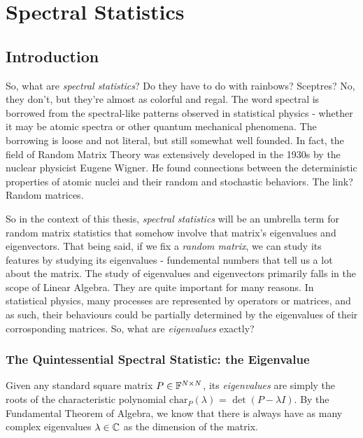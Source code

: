 
\chapter{Spectral Statistics}

\section{Introduction}
So, what are \textit{spectral statistics}? Do they have to do with rainbows? Sceptres? No, they don’t, but they’re almost as colorful and regal. The word spectral is borrowed from the spectral-like patterns observed in statistical physics - whether it may be atomic spectra or other quantum mechanical phenomena. The borrowing is loose and not literal, but still somewhat well founded. In fact, the field of Random Matrix Theory was extensively developed in the 1930s by the nuclear physicist Eugene Wigner. He found connections between the deterministic properties of atomic nuclei and their random and stochastic behaviors. The link? Random matrices.

So in the context of this thesis, \textit{spectral statistics} will be an umbrella term for random matrix statistics that somehow involve that matrix's eigenvalues and eigenvectors. That being said, if we fix a \textit{random matrix}, we can study its features by studying its eigenvalues - fundemental numbers that tell us a lot about the matrix. The study of eigenvalues and eigenvectors primarily falls in the scope of Linear Algebra. They are quite important for many reasons. In statistical physics, many processes are represented by operators or matrices, and as such, their behaviours could be partially determined by the eigenvalues of their corrosponding matrices. So, what are \textit{eigenvalues} exactly?


\subsection{The Quintessential Spectral Statistic: the Eigenvalue}
Given any standard square matrix $P \in \mathbb{F}^{N \times N}$, its \textit{eigenvalues} are simply the roots of the characteristic polynomial $\text{char}_P{(\lambda)}$ = $\det(P - \lambda I)$. By the Fundamental Theorem of Algebra, we know that there is always have as many complex eigenvalues $\lambda \in \mathbb{C}$ as the dimension of the matrix. 

